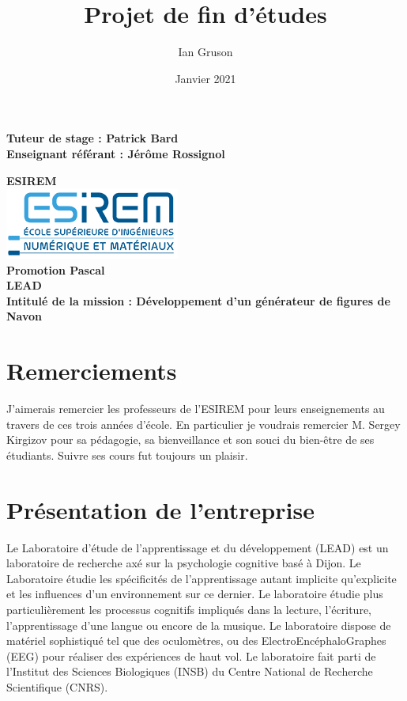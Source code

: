 \documentclass{article}
\title{Projet de fin d'études}
\author{Ian Gruson}
\date{Janvier 2021}
\begin{document}
\maketitle
\begin{center}
	\large\textbf{Tuteur de stage : Patrick Bard}\\
	\large\textbf{Enseignant référant : Jérôme Rossignol}

\end{center}
\begin{center}
	\large\textbf{ESIREM}\\
	\includegraphics[scale=0.7]{images/logoEsirem}\\
	\large\textbf{Promotion Pascal}
	\\
	\large\textbf{LEAD}\\
	\large\textbf{Intitulé de la mission : Développement d'un générateur de figures de Navon}
\end{center}
\newpage
\renewcommand{\contentsname}{Sommaire}
\tableofcontents
\newpage
\renewcommand{\listfigurename}{Liste des figures}
\listoffigures
\newpage
\section{Remerciements}
J'aimerais remercier les professeurs de l'ESIREM pour leurs enseignements au travers de ces trois années d'école. En particulier je voudrais remercier M. Sergey Kirgizov pour sa pédagogie, sa bienveillance et son souci du bien-être de ses étudiants. Suivre ses cours fut toujours un plaisir.

\newpage
\section{Présentation de l'entreprise}
Le Laboratoire d'étude de l'apprentissage et du développement (LEAD) est un laboratoire de recherche axé sur la psychologie cognitive basé à Dijon. Le Laboratoire étudie les spécificités de l'apprentissage autant implicite qu'explicite et les influences d'un environnement sur ce dernier. Le laboratoire étudie plus particulièrement les processus cognitifs impliqués dans la lecture, l'écriture, l'apprentissage d'une langue ou encore de la musique. Le laboratoire dispose de matériel sophistiqué tel que des oculomètres, ou des ElectroEncéphaloGraphes (EEG) pour réaliser des expériences de haut vol. Le laboratoire fait parti de l'Institut des Sciences Biologiques (INSB) du Centre National de Recherche Scientifique (CNRS).  
\end{document}
